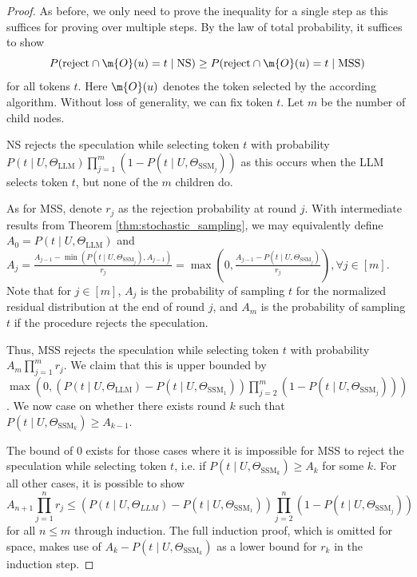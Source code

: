 \begin{proof}
As before, we only need to prove the inequality for a single step as this suffices for proving over multiple steps. By the law of total probability, it suffices to show 
$$P(\textrm{reject} \cap \m{O}(u)=t \mid \textrm{NS}) \geq P(\textrm{reject} \cap \m{O}(u)=t \mid \textrm{MSS})$$
for all tokens $t$. Here $\m{O}(u)$ denotes the token selected by the according algorithm. Without loss of generality, we can fix token $t$. Let $m$ be the number of child nodes. 

NS rejects the speculation while selecting token $t$ with probability $P(t \mid U, \Theta_{\textrm{LLM}})\prod_{j=1}^m (1-P(t \mid U, \Theta_{\textrm{SSM}_j}))$ as this occurs when the LLM selects token $t$, but none of the $m$ children do.

As for MSS, denote $r_j$ as the rejection probability at round $j$. With intermediate results from Theorem \ref{thm:stochastic_sampling}, we may equivalently define $A_0 = P(t \mid U, \Theta_{\textrm{LLM}})$ and $A_{j} = \frac{A_{j-1} - \min(P(t \mid U, \Theta_{\textrm{SSM}_j}),A_{j-1})}{r_j} = \max(0, \frac{A_{j-1}-P(t \mid U, \Theta_{\textrm{SSM}_j})}{r_j}), \forall j \in [m]$. Note that for $j \in [m]$, $A_j$ is the probability of sampling $t$ for the normalized residual distribution at the end of round $j$, and $A_{m}$ is the probability of sampling $t$ if the procedure rejects the speculation.

Thus, MSS rejects the speculation while selecting token $t$ with probability $A_{m}\prod_{j=1}^m r_j$. We claim that this is upper bounded by $\max(0, (P(t \mid U, \Theta_{\textrm{LLM}})-P(t \mid U, \Theta_{\textrm{SSM}_1}))\prod_{j=2}^m (1-P(t \mid U, \Theta_{\textrm{SSM}_j})))$.
We now case on whether there exists round $k$ such that $P(t \mid U, \Theta_{\textrm{SSM}_k}) \geq A_{k-1}$.


\iffalse %
The bound of $0$ exists for those cases where it is impossible for MSS to reject the speculation while selecting token $t$, i.e. if $P(t \mid U, \Theta_{\textrm{SSM}_k}) \geq A_k$ for some $k$. For all other cases, it is possible to show
\[
A_{n+1}\prod_{j=1}^n r_j \leq (P(t \mid U, \Theta_{LLM})-P(t \mid U, \Theta_{\textrm{SSM}_1}))\prod_{j=2}^n (1-P(t \mid U, \Theta_{\textrm{SSM}_j}))
\] for all $n \leq m$ through induction. The full induction proof, which is omitted for space, makes use of $A_k - P(t \mid U, \Theta_{\textrm{SSM}_k})$ as a lower bound for $r_k$ in the induction step.


\end{proof}
